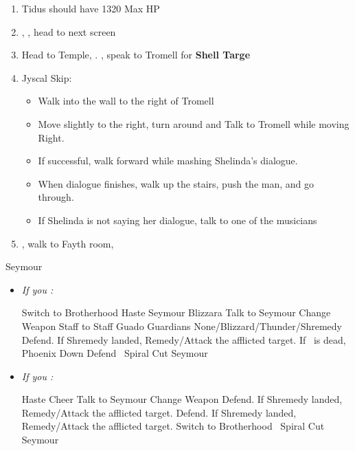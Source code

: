\begin{enumerate}[resume]
  \item Tidus should have 1320 Max HP
  \item \sd, \cs[0:40], head to next screen
  \item Head to Temple, \sd. \save, speak to Tromell for \textbf{Shell Targe}
  \item Jyscal Skip:
        \begin{itemize}
          \item Walk into the wall to the right of Tromell
          \item Move slightly to the right, turn around and Talk to Tromell while moving Right.
          \item If successful, walk forward while mashing Shelinda's dialogue.
          \item When dialogue finishes, walk up the stairs, push the man, and go through.
          \item If Shelinda is not saying her dialogue, talk to one of the musicians
        \end{itemize}
  \item \sd, walk to Fayth room, \cs[2:10]
\end{enumerate}
\vfill
\begin{battle}[3000]{Seymour}
  \begin{itemize}
  \item \textit{If you \wonblitz:}
  \begin{itemize}
  
    \tidusf Switch to Brotherhood
    \tidusf Haste \tidus
    \enemyf Seymour Blizzara
    \tidusf Talk to Seymour
    \yunaf Change Weapon Staff to Staff
    \enemyf Guado Guardians None/Blizzard/Thunder/Shremedy
    \kimahrif Defend. If Shremedy landed, Remedy/Attack the afflicted target. If \yuna\ is dead, Phoenix Down
    \switch{\yuna}{\auron}
    \auronf Defend
    \tidusf \od\ Spiral Cut Seymour
  \end{itemize}
  \item \textit{If you \lostblitz:}
  \begin{itemize}
  \tidusf Haste \tidus
  \tidusf Cheer
  \tidusf Talk to Seymour
  \yunaf Change Weapon
  \switch{\kimahri}{\rikku}
  \rikkuf Defend. If Shremedy landed, Remedy/Attack the afflicted target.
  \switch{\yuna}{\kimahri}
  \kimahrif Defend. If Shremedy landed, Remedy/Attack the afflicted target.
  \tidusf Switch to Brotherhood
    \tidusf \od\ Spiral Cut Seymour
  \end{itemize}
  \end{itemize}
\end{battle}
